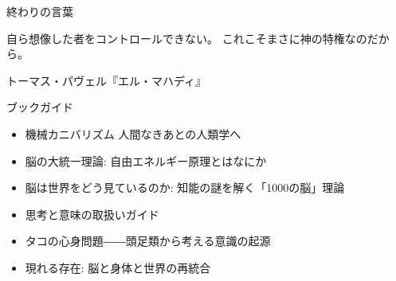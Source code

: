 \documentclass[12pt, unicode]{beamer}
\begin{document}
\begin{frame}{終わりの言葉}

自ら想像した者をコントロールできない。
これこそまさに神の特権なのだから。

トーマス・パヴェル『エル・マハディ』

\end{frame}

\begin{frame}{ブックガイド}

\begin{itemize}
\item 機械カニバリズム 人間なきあとの人類学へ
\item 脳の大統一理論: 自由エネルギー原理とはなにか
\item 脳は世界をどう見ているのか: 知能の謎を解く「1000の脳」理論
\item 思考と意味の取扱いガイド
\item タコの心身問題――頭足類から考える意識の起源
\item 現れる存在: 脳と身体と世界の再統合
\end{itemize}

\end{frame}
\end{document}
